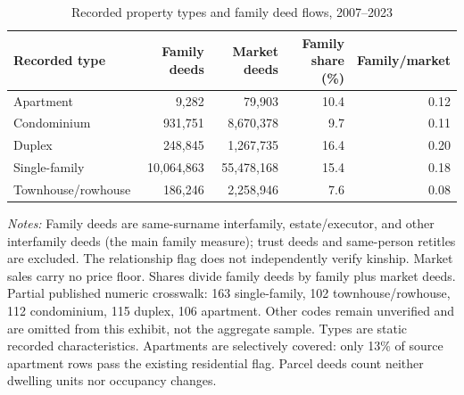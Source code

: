 \begin{table}[!ht]\centering\small
\caption{Recorded property types and family deed flows, 2007--2023}
\label{tab:propertytypes}
\begin{tabular}{lrrrr}\toprule
Recorded type & Family deeds & Market deeds & Family share (\%) & Family/market \\
\midrule
Apartment & 9,282 & 79,903 & 10.4 & 0.12 \\
Condominium & 931,751 & 8,670,378 & 9.7 & 0.11 \\
Duplex & 248,845 & 1,267,735 & 16.4 & 0.20 \\
Single-family & 10,064,863 & 55,478,168 & 15.4 & 0.18 \\
Townhouse/rowhouse & 186,246 & 2,258,946 & 7.6 & 0.08 \\
\bottomrule\end{tabular}
\begin{minipage}{.95\linewidth}\footnotesize\textit{Notes:} Family deeds are same-surname interfamily, estate/executor, and other interfamily deeds (the main family measure); trust deeds and same-person retitles are excluded. The relationship flag does not independently verify kinship. Market sales carry no price floor. Shares divide family deeds by family plus market deeds. Partial published numeric crosswalk: 163 single-family, 102 townhouse/rowhouse, 112 condominium, 115 duplex, 106 apartment. Other codes remain unverified and are omitted from this exhibit, not the aggregate sample. Types are static recorded characteristics. Apartments are selectively covered: only 13\% of source apartment rows pass the existing residential flag. Parcel deeds count neither dwelling units nor occupancy changes.\end{minipage}
\end{table}
